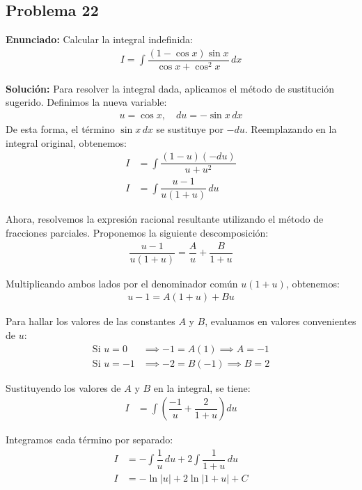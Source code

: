 \subsection*{Problema 22}

\textbf{Enunciado:}
Calcular la integral indefinida:
\begin{align*}
I = \int \dfrac{(1 - \cos x)\sin x}{\cos x + \cos^2 x} \, dx
\end{align*}

\textbf{Solución:}
Para resolver la integral dada, aplicamos el método de sustitución sugerido. Definimos la nueva variable:
\begin{align*}
u = \cos x, \quad du = -\sin x \, dx
\end{align*}
De esta forma, el término $\sin x \, dx$ se sustituye por $-du$. Reemplazando en la integral original, obtenemos:
\begin{align*}
I &= \int \dfrac{(1 - u)(-du)}{u + u^2} \\
I &= \int \dfrac{u - 1}{u(1 + u)} \, du
\end{align*}

Ahora, resolvemos la expresión racional resultante utilizando el método de fracciones parciales. Proponemos la siguiente descomposición:
\begin{align*}
\dfrac{u - 1}{u(1 + u)} = \dfrac{A}{u} + \dfrac{B}{1 + u}
\end{align*}

Multiplicando ambos lados por el denominador común $u(1 + u)$, obtenemos:
\begin{align*}
u - 1 = A(1 + u) + B u
\end{align*}

Para hallar los valores de las constantes $A$ y $B$, evaluamos en valores convenientes de $u$:
\begin{align*}
\text{Si } u = 0 &\implies -1 = A(1) \implies A = -1 \\
\text{Si } u = -1 &\implies -2 = B(-1) \implies B = 2
\end{align*}

Sustituyendo los valores de $A$ y $B$ en la integral, se tiene:
\begin{align*}
I &= \int \left( \dfrac{-1}{u} + \dfrac{2}{1 + u} \right) du
\end{align*}

Integramos cada término por separado:
\begin{align*}
I &= -\int \dfrac{1}{u} \, du + 2 \int \dfrac{1}{1 + u} \, du \\
I &= -\ln|u| + 2\ln|1 + u| + C
\end{align*}

